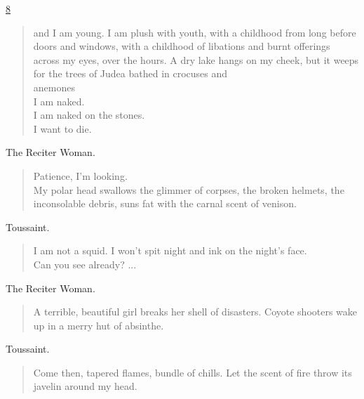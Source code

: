 \documentclass[letterpaper,article,12pt,oneside,notitlepage]{memoir}
\begin{document}
\clearpage

\href{http://cesaire.elotroalex.com/chiens/chiens/p008.html}{8}

\begin{verse}
\indent and I am young. I am plush with youth, with a childhood from long before doors and windows, with a childhood of libations and burnt offerings across my eyes, over the hours. A dry lake hangs on my cheek, but it weeps for the trees of Judea bathed in crocuses and \\
anemones \\
I am naked. \\
I am naked on the stones. \\
I want to die. \\
\end{verse}

\begin{center}The Reciter Woman.\end{center}

\begin{verse}
\hspace{1cm} Patience, I'm looking. \\
My polar head swallows the glimmer of corpses, the broken helmets, the inconsolable debris, suns fat with the carnal scent of venison. \\
\end{verse}

\begin{center}Toussaint.\end{center}

\begin{verse}
\indent I am not a squid. I won't spit night and ink on the night's face. \\
Can you see already? ... \\
\end{verse}

\begin{center}The Reciter Woman.\end{center}

\begin{verse}
\indent A terrible, beautiful girl breaks her shell of disasters. Coyote shooters wake up in a merry hut of absinthe. \\
\end{verse}

\begin{center}Toussaint.\end{center}

\begin{verse}
Come then, tapered flames, bundle of chills. Let the scent of fire throw its javelin around my head. \\
\end{verse}
\end{document}
